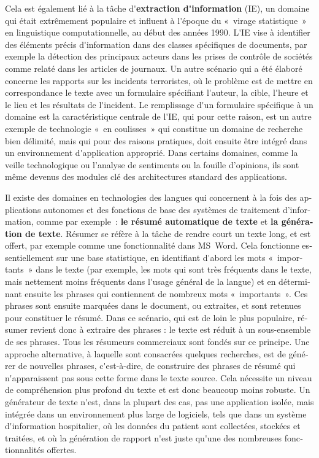 \documentclass[]{../metanetpaper}
\begin{document}
\begin{french}
\begin{multicols}{2}
Cela est également lié à la tâche d{\mbox '}{\bf extraction d{\mbox '}information}
(IE), un domaine qui était extrêmement populaire et influent à
l{\mbox '}époque du «~virage statistique~» en linguistique computationnelle,
au début des années 1990. L{\mbox '}IE vise à identifier des éléments précis
d{\mbox '}information dans des classes spécifiques de documents, par exemple
la détection des principaux acteurs dans les prises de contrôle de
sociétés comme relaté dans les articles de journaux. Un autre scénario
qui a été élaboré concerne les rapports sur les incidents terroristes,
où le problème est de mettre en correspondance le texte avec un
formulaire spécifiant l{\mbox '}auteur, la cible, l{\mbox '}heure et le lieu et les
résultats de l{\mbox '}incident. Le remplissage d{\mbox '}un formulaire spécifique à
un domaine est la caractéristique centrale de l{\mbox '}IE, qui pour cette
raison, est un autre exemple de technologie «~en coulisses~» qui
constitue un domaine de recherche bien délimité, mais qui pour des
raisons pratiques, doit ensuite être intégré dans un environnement
d{\mbox '}application approprié. Dans certains domaines, comme la veille technologique ou
l'analyse de sentiments ou la fouille d'opinions, ils sont même devenus des modules clé des
architectures standard des applications.

Il existe des domaines en technologies des langues qui concernent à la fois des applications autonomes et des fonctions de base des systèmes de traitement d'information, comme par exemple~: {\bf le résumé automatique de texte} et {\bf la génération de texte}. Résumer se réfère à la tâche de
rendre court un texte long, et est offert, par exemple comme une
fonctionnalité dans MS~Word. Cela fonctionne essentiellement sur une
base statistique, en identifiant d{\mbox '}abord les mots
«~importants~» dans le texte (par exemple, les mots qui sont très
fréquents dans le texte, mais nettement moins fréquents dans l{\mbox
  '}usage général de la langue) et en déterminant ensuite les phrases
qui contiennent de nombreux mots «~importants~». Ces phrases sont
ensuite marquées dans le document, ou extraites, et sont retenues pour
constituer le résumé. Dans ce scénario, qui est de loin le plus
populaire, résumer revient donc à extraire des phrases : le texte est
réduit à un sous-ensemble de ses phrases. Tous les résumeurs
commerciaux sont fondés sur ce principe. Une approche alternative, à laquelle
sont consacrées quelques recherches, est de générer de nouvelles
phrases, c{\mbox '}est-à-dire, de construire des phrases de résumé qui
n{\mbox '}apparaissent pas sous cette forme dans le texte source. Cela
nécessite un niveau de compréhension plus profond du texte et est donc
beaucoup moins robuste. Un générateur de texte n{\mbox '}est, dans la
plupart des cas, pas une application isolée, mais intégrée dans un
environnement plus large de logiciels, tels que dans un système
d{\mbox '}information hospitalier, où les données du patient sont
collectées, stockées et traitées, et où la génération de rapport
n{\mbox '}est juste qu{\mbox '}une des nombreuses fonctionnalités
offertes.


\end{multicols}
\end{french}
\end{document}

